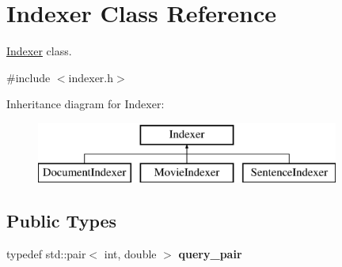 \hypertarget{class_indexer}{}\section{Indexer Class Reference}
\label{class_indexer}


\hyperlink{class_indexer}{Indexer} class.  




{\ttfamily \#include $<$indexer.\+h$>$}

Inheritance diagram for Indexer\+:\begin{figure}[H]
\begin{center}
\leavevmode
\includegraphics[height=2.000000cm]{class_indexer}
\end{center}
\end{figure}
\subsection*{Public Types}
\begin{DoxyCompactItemize}
\item 
\mbox{\label{class_indexer_a22640e826daa9ff32e9c78dbb08ec042}} 
typedef std\+::pair$<$ int, double $>$ {\bfseries query\+\_\+pair}
\end{DoxyCompactItemize}
